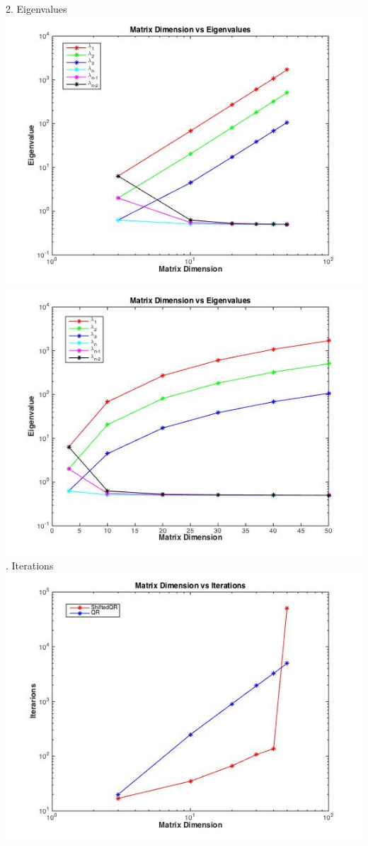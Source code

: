 \documentclass[12pt,a4paper]{article}
\begin{document}
2. Eigenvalues\\
\includegraphics[scale =0.7]{./eig.jpg}\\
\includegraphics[scale =0.7]{./semieig.jpg}\\
. Iterations\\
\includegraphics[scale =0.7]{./iter.jpg}\\
\end{document}
